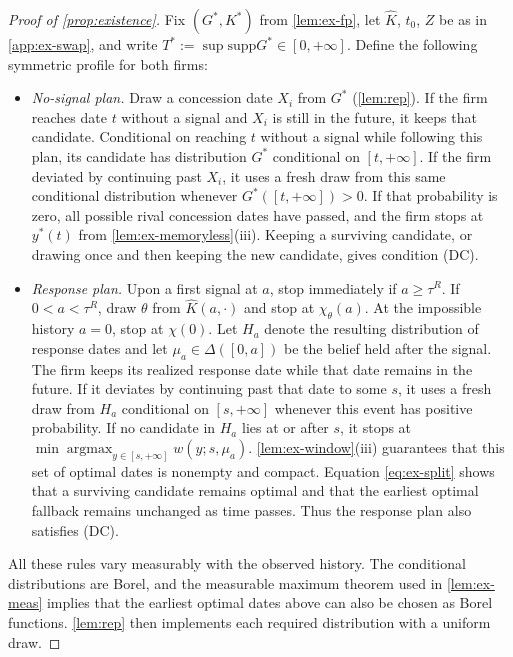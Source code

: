 \documentclass[12pt,reqno]{article}
\newcommand{\supp}{\mathrm{supp}}
\theoremstyle{definition} \newtheorem{example}{Example}
\theoremstyle{definition} \newtheorem{condition}{Condition}
\theoremstyle{definition} \newtheorem{corollary}{Corollary}
\theoremstyle{definition} \newtheorem{claim}{Claim}
\theoremstyle{definition} \newtheorem{definition}{Definition}
\theoremstyle{definition} \newtheorem{conjecture}{Conjecture}
\theoremstyle{definition} \newtheorem{Lemma}{Lemma}
\theoremstyle{definition} \newtheorem{lemma}{Lemma}
\theoremstyle{plain} \newtheorem{theorem}{Theorem}
\theoremstyle{definition} \newtheorem{assumption}{Assumption}
\theoremstyle{definition} \newtheorem*{assumptionnonumber}{Assumption}
\theoremstyle{definition} \newtheorem*{theoremNoNumber}{Proposition}
\theoremstyle{definition}
\theoremstyle{definition}\newtheorem{proposition}{Proposition}
\theoremstyle{definition} \newtheorem{result}{Result}
\theoremstyle{definition} \newtheorem*{definitionNoNumber}{Definition}
\theoremstyle{definition} \newtheorem{Definition}{Definition}
\theoremstyle{definition} \newtheorem*{DefinitionNoNumber}{Definition}
\theoremstyle{definition} \newtheorem*{fact}{Fact}
\theoremstyle{definition} \newtheorem*{property}{Property}
\DeclareMathOperator*{\argmax}{argmax}
\theoremstyle{definition} \newtheorem{remark}{Remark}
\begin{document}
\begin{proof}[Proof of \cref{prop:existence}]
Fix $(G^\ast,K^\ast)$ from \cref{lem:ex-fp}, let $\hat K$, $t_0$, $Z$ be as in \cref{app:ex-swap}, and write $T^\ast:=\sup\supp G^\ast\in[0,+\infty]$. Define the following symmetric profile for both firms:
\begin{itemize}
\item[(a)] \emph{No-signal plan.} Draw a concession date $X_i$ from $G^\ast$ (\cref{lem:rep}). If the firm reaches date $t$ without a signal and $X_i$ is still in the future, it keeps that candidate. Conditional on reaching $t$ without a signal while following this plan, its candidate has distribution $G^\ast$ conditional on $[t,+\infty]$. If the firm deviated by continuing past $X_i$, it uses a fresh draw from this same conditional distribution whenever $G^\ast([t,+\infty])>0$. If that probability is zero, all possible rival concession dates have passed, and the firm stops at $y^\ast(t)$ from \cref{lem:ex-memoryless}(iii). Keeping a surviving candidate, or drawing once and then keeping the new candidate, gives condition \textup{(DC)}.
\item[(b)] \emph{Response plan.} Upon a first signal at $a$, stop immediately if $a\ge\tau^R$. If $0<a<\tau^R$, draw $\theta$ from $\hat K(a,\cdot)$ and stop at $\chi_\theta(a)$. At the impossible history $a=0$, stop at $\chi(0)$. Let $H_a$ denote the resulting distribution of response dates and let $\mu_a\in\Delta([0,a])$ be the belief held after the signal. The firm keeps its realized response date while that date remains in the future. If it deviates by continuing past that date to some $s$, it uses a fresh draw from $H_a$ conditional on $[s,+\infty]$ whenever this event has positive probability. If no candidate in $H_a$ lies at or after $s$, it stops at
$
\min\argmax_{y\in[s,+\infty]}w(y;s,\mu_a).$ \cref{lem:ex-window}(iii) guarantees that this set of optimal dates is nonempty and compact. Equation \eqref{eq:ex-split} shows that a surviving candidate remains optimal and that the earliest optimal fallback remains unchanged as time passes. Thus the response plan also satisfies \textup{(DC)}.
\end{itemize}
All these rules vary measurably with the observed history. The conditional distributions are Borel, and the measurable maximum theorem used in \cref{lem:ex-meas} implies that the earliest optimal dates above can also be chosen as Borel functions. \cref{lem:rep} then implements each required distribution with a uniform draw.


\end{proof}
\end{document}

